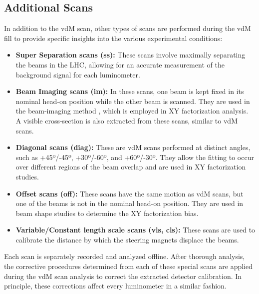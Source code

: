 \subsection{Additional Scans}

In addition to the vdM scan, other types of scans are performed during the vdM fill to provide specific insights into the various experimental conditions:

\begin{itemize}
    \item \textbf{Super Separation scans (ss):} These scans involve maximally separating the beams in the LHC, allowing for an accurate measurement of the background signal for each luminometer.
    \item \textbf{Beam Imaging scans (im):} In these scans, one beam is kept fixed in its nominal head-on position while the other beam is scanned. They are used in the beam-imaging method \cite{Klute_2017}, which is employed in XY factorization analysis. A visible cross-section is also extracted from these scans, similar to vdM scans.
    \item \textbf{Diagonal scans (diag):} These are vdM scans performed at distinct angles, such as +45º/-45º, +30º/-60º, and +60º/-30º. They allow the fitting to occur over different regions of the beam overlap and are used in XY factorization studies.
    \item \textbf{Offset scans (off):} These scans have the same motion as vdM scans, but one of the beams is not in the nominal head-on position. They are used in beam shape studies to determine the XY factorization bias.
    \item \textbf{Variable/Constant length scale scans (vls, cls):} These scans are used to calibrate the distance by which the steering magnets displace the beams.
\end{itemize}

Each scan is separately recorded and analyzed offline. After thorough analysis, the corrective procedures determined from each of these special scans are applied during the vdM scan analysis to correct the extracted detector calibration. In principle, these corrections affect every luminometer in a similar fashion.
